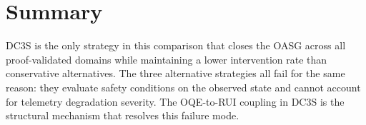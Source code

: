 \section{Summary}

DC3S is the only strategy in this comparison that closes the OASG across
all proof-validated domains while maintaining a lower intervention rate than
conservative alternatives.  The three alternative strategies all fail for
the same reason: they evaluate safety conditions on the observed state and
cannot account for telemetry degradation severity.  The OQE-to-RUI coupling
in DC3S is the structural mechanism that resolves this failure mode.
